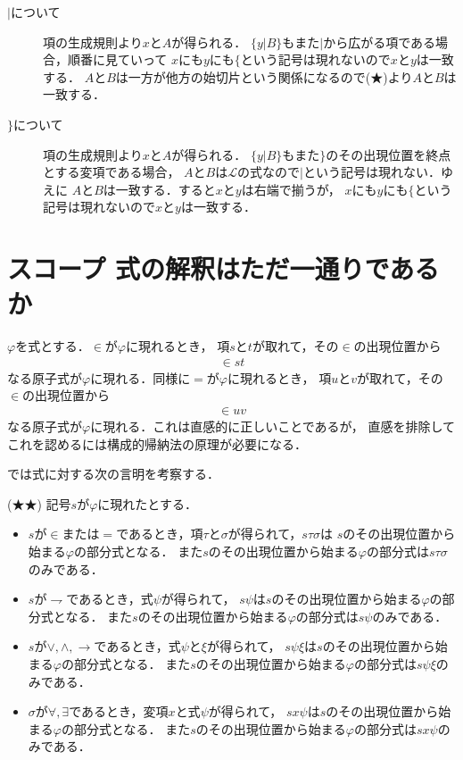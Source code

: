 \documentclass[a4j,10.5pt,oneside,openany]{jsbook}
\begin{document}
\begin{description}
		\item[$|$について]
			項の生成規則より$x$と$A$が得られる．
			$\{y|B\}$もまた$|$から広がる項である場合，順番に見ていって
			$x$にも$y$にも$\{$という記号は現れないので$x$と$y$は一致する．
			$A$と$B$は一方が他方の始切片という関係になるので(★)より$A$と$B$は一致する．
			
		\item[$\}$について]
			項の生成規則より$x$と$A$が得られる．
			$\{y|B\}$もまた$\}$のその出現位置を終点とする変項である場合，
			$A$と$B$は$\mathcal{L}$の式なので$|$という記号は現れない．ゆえに
			$A$と$B$は一致する．すると$x$と$y$は右端で揃うが，
			$x$にも$y$にも$\{$という記号は現れないので$x$と$y$は一致する．
	\end{description}
	
\section{スコープ 式の解釈はただ一通りであるか}
	$\varphi$を式とする．$\in$が$\varphi$に現れるとき，
	項$s$と$t$が取れて，その$\in$の出現位置から
	\begin{align}
		\in st
	\end{align}
	なる原子式が$\varphi$に現れる．同様に$=$が$\varphi$に現れるとき，
	項$u$と$v$が取れて，その$\in$の出現位置から
	\begin{align}
		\in uv
	\end{align}
	なる原子式が$\varphi$に現れる．これは直感的に正しいことであるが，
	直感を排除してこれを認めるには構成的帰納法の原理が必要になる．
	
	では式に対する次の言明を考察する．
	
	\begin{screen}
		(★★) 記号$s$が$\varphi$に現れたとする．
		\begin{itemize}
			\item $s$が$\in$または$=$であるとき，項$\tau$と$\sigma$が得られて，$s \tau \sigma$は
				$s$のその出現位置から始まる$\varphi$の部分式となる．
				また$s$のその出現位置から始まる$\varphi$の部分式は$s \tau \sigma$のみである．
				
			\item $s$が$\rightharpoondown$であるとき，式$\psi$が得られて，
				$s \psi$は$s$のその出現位置から始まる$\varphi$の部分式となる．
				また$s$のその出現位置から始まる$\varphi$の部分式は$s \psi$のみである．
				
			\item $s$が$\vee,\wedge,\rightarrow$であるとき，式$\psi$と$\xi$が得られて，
				$s \psi \xi$は$s$のその出現位置から始まる$\varphi$の部分式となる．
				また$s$のその出現位置から始まる$\varphi$の部分式は$s \psi \xi$のみである．
				
			\item $\sigma$が$\forall, \exists$であるとき，変項$x$と式$\psi$が得られて，
				$s x \psi$は$s$のその出現位置から始まる$\varphi$の部分式となる．
				また$s$のその出現位置から始まる$\varphi$の部分式は$s x \psi$のみである．
		\end{itemize}
	\end{screen}
	
\end{document}
